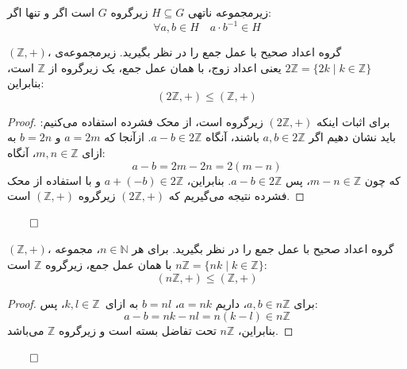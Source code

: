 \begin{frame}
    \begin{theorem}

        زیرمجموعه ناتهی \( H \subseteq G \) زیرگروه \( G \) است اگر و تنها اگر:
        \[
            \forall a, b \in H \quad a \cdot b^{-1} \in H
        \]
    \end{theorem}
    \begin{example}
        \( (\mathbb{Z}, +) \)، گروه اعداد صحیح با عمل جمع را در نظر بگیرید.
        زیرمجموعه‌ی \( 2\mathbb{Z} = \{ 2k \mid k \in \mathbb{Z} \} \) یعنی اعداد زوج، با همان عمل جمع، یک زیرگروه از \( \mathbb{Z} \) است، بنابراین:
        \[
            (2\mathbb{Z}, +) \leq (\mathbb{Z}, +)
        \]
    \end{example}

    \begin{proof}
        برای اثبات اینکه \( (2\mathbb{Z}, +) \) زیرگروه است، از محک فشرده استفاده می‌کنیم:
        باید نشان دهیم اگر \( a, b \in 2\mathbb{Z} \) باشند، آنگاه \( a - b \in 2\mathbb{Z} \).
        ازآنجا که \( a = 2m \) و \( b = 2n \)  به ازای \( m, n \in \mathbb{Z} \)، آنگاه:
        \[
            a - b = 2m - 2n = 2(m - n)
        \]
        که چون \( m - n \in \mathbb{Z} \)، پس \( a - b \in 2\mathbb{Z} \).
        بنابراین، \( a + (-b) \in 2\mathbb{Z} \) و با استفاده از محک فشرده نتیجه می‌گیریم که \( (2\mathbb{Z}, +) \) زیرگروه \( (\mathbb{Z}, +) \) است.
    \end{proof}
    \hfill
    \(\qed\)
\end{frame}



\begin{frame}
    \begin{example}
        \( (\mathbb{Z}, +) \)، گروه اعداد صحیح با عمل جمع را در نظر بگیرید.
        برای هر \( n \in \mathbb{N} \)، مجموعه \( n\mathbb{Z} = \{ nk \mid k \in \mathbb{Z} \} \) با همان عمل جمع، زیرگروه \( \mathbb{Z} \) است:
        \[
            (n\mathbb{Z}, +) \leq (\mathbb{Z}, +)
        \]
    \end{example}

    \begin{proof}
        برای \( a, b \in n\mathbb{Z} \)، داریم \( a = nk \)، \( b = nl \)  به ازای \( k, l \in \mathbb{Z} \)، پس:
        \[
            a - b = nk - nl = n(k - l) \in n\mathbb{Z}
        \]
        بنابراین، \( n\mathbb{Z} \) تحت تفاضل بسته است و زیرگروه \( \mathbb{Z} \) می‌باشد.
    \end{proof}
    \hfill
    \(\qed\)
\end{frame}

